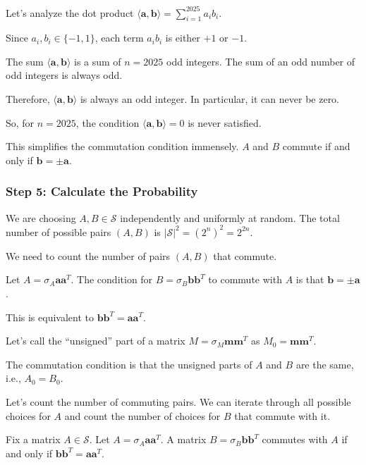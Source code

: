 \documentclass[12pt,a4paper]{article}
\theoremstyle{definition}
\begin{document}
        Let's analyze the dot product $\langle \mathbf{a}, \mathbf{b} \rangle = \sum_{i=1}^{2025} a_i b_i$.

        Since $a_i, b_i \in \{-1, 1\}$, each term $a_i b_i$ is either $+1$ or $-1$.

        The sum $\langle \mathbf{a}, \mathbf{b} \rangle$ is a sum of $n=2025$ odd integers. The sum of an odd number of odd integers is always odd.

        Therefore, $\langle \mathbf{a}, \mathbf{b} \rangle$ is always an odd integer. In particular, it can never be zero.

        So, for $n=2025$, the condition $\langle \mathbf{a}, \mathbf{b} \rangle = 0$ is never satisfied.

        This simplifies the commutation condition immensely. $A$ and $B$ commute if and only if $\mathbf{b} = \pm\mathbf{a}$.

        \subsubsection*{Step 5: Calculate the Probability}

        We are choosing $A, B \in \mathcal{S}$ independently and uniformly at random. The total number of possible pairs $(A, B)$ is $|\mathcal{S}|^2 = (2^n)^2 = 2^{2n}$.

        We need to count the number of pairs $(A, B)$ that commute.

        Let $A = \sigma_A \mathbf{a}\mathbf{a}^T$. The condition for $B = \sigma_B \mathbf{b}\mathbf{b}^T$ to commute with $A$ is that $\mathbf{b} = \pm \mathbf{a}$.

        This is equivalent to $\mathbf{b}\mathbf{b}^T = \mathbf{a}\mathbf{a}^T$.

        Let's call the ``unsigned'' part of a matrix $M = \sigma_M \mathbf{m}\mathbf{m}^T$ as $M_0 = \mathbf{m}\mathbf{m}^T$.

        The commutation condition is that the unsigned parts of $A$ and $B$ are the same, i.e., $A_0 = B_0$.

        Let's count the number of commuting pairs. We can iterate through all possible choices for $A$ and count the number of choices for $B$ that commute with it.

        Fix a matrix $A \in \mathcal{S}$. Let $A = \sigma_A \mathbf{a}\mathbf{a}^T$. A matrix $B = \sigma_B \mathbf{b}\mathbf{b}^T$ commutes with $A$ if and only if $\mathbf{b}\mathbf{b}^T = \mathbf{a}\mathbf{a}^T$.
\end{document}
